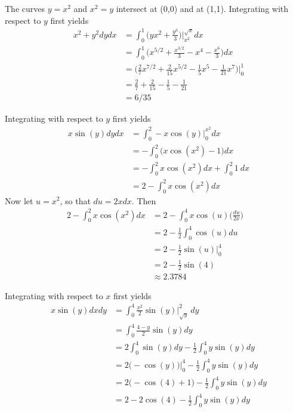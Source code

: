 \item %
The curves $y=x^2$ and $x^2=y$ intersect at (0,0) and at (1,1). Integrating with respect to $y$ first yields
\begin{align*} 
  \mathop{\int_0^1 \!\!\! \int_{x^2}^{\sqrt{x}}} x^2+y^2 dydx 
  &= \int_0^1 \Big(yx^2 + \frac{y^3}{3} \Big)\Big|_{x^2}^{\sqrt{x}} dx \\
  &= \int_0^1 \Big(x^{5/2} + \frac{x^{3/2}}{3} - x^4 - \frac{x^6}{3}\Big) dx \\
  &= \Big( \frac{2}{7} x^{7/2} + \frac{2}{15}x^{5/2} - \frac{1}{5}x^5 - \frac{1}{21}x^7\Big)\Big|_0^1 \\
  &= \frac{2}{7} + \frac{2}{15} - \frac{1}{5} - \frac{1}{21} \\
  &= 6/35
\end{align*}
\item %
\BEN 
\item Integrating with respect to $y$ first yields
\begin{align*} 
  \mathop{\int_0^2 \!\!\! \int_0^{x^2}} x\sin (y) dydx 
  &= \int_0^2 -x\cos(y)\Big|_0^{x^2} dx \\
  &= - \int_0^2 \Big(x\cos(x^2)-1\Big) dx \\
  &= - \int_0^2x\cos(x^2) dx +  \int_0^2 1 \ dx \\    
  &= 2 - \int_0^2x\cos(x^2) dx 
\end{align*}
Now let $u=x^2$, so that $du = 2xdx$. Then 
\begin{align*} 
  2 - \int_0^2x\cos(x^2) dx  
  &=  2 - \int_0^4 x\cos(u)\Big(\frac{du}{2x}\Big)\\
  &=  2 - \frac{1}{2} \int_0^4 \cos(u)du \\
  &=  2 - \frac{1}{2} \sin(u) \Big|_0^4 \\
  &=  2 - \frac{1}{2} \sin(4) \\
  &\approx 2.3784
\end{align*}
\item Integrating with respect to $x$ first yields
\begin{align*} 
  \mathop{\int_0^4 \!\!\! \int_{\sqrt{y}}^{2} } x\sin (y) dxdy
  &= \int_0^4 \frac{x^2}{2}\sin(y)\Big|_{\sqrt{y}}^{2} \ dy \\
  &= \int_0^4 \frac{4-y}{2}\sin(y) dy \\
  &= 2 \int_0^4 \sin(y) dy - \frac{1}{2} \int_0^4 y\sin(y) dy \\
  &= 2 \big( - \cos(y) \big)\big|_0^4 - \frac{1}{2} \int_0^4 y\sin(y) dy \\
  &= 2 \big( - \cos(4) + 1 \big) - \frac{1}{2} \int_0^4 y\sin(y) dy \\
  &= 2  - 2\cos(4)  - \frac{1}{2} \int_0^4 y\sin(y) dy \\
\end{align*}
